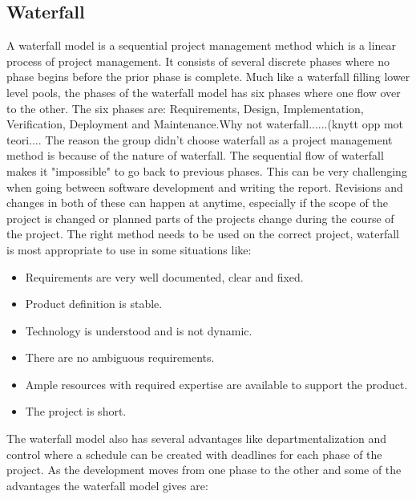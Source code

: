 \subsection{Waterfall}
A waterfall model is a sequential project management method which is a linear process of project management\cite{Waterfall_model}. It consists of several discrete phases where no phase begins before the prior phase is complete. Much like a waterfall filling lower level pools, the phases of the waterfall model has six phases where one flow over to the other. The six phases are: Requirements, Design, Implementation, Verification, Deployment and Maintenance\cite{Waterfall_phases}.Why not waterfall......(knytt opp mot teori.... The reason the group didn't choose waterfall as a project management method is because of the nature of waterfall. The sequential flow of waterfall makes it "impossible" to go back to previous phases. This can be very challenging when going between software development and writing the report. Revisions and changes in both of these can happen at anytime, especially if the scope of the project is changed or planned parts of the projects change during the course of the project.
The right method needs to be used on the correct project, waterfall is most appropriate to use in some situations like:
\begin{itemize}
    \item Requirements are very well documented, clear and fixed.\cite{SDLC_Waterfall_Model}
    \item Product definition is stable.\cite{SDLC_Waterfall_Model}
    \item Technology is understood and is not dynamic.\cite{SDLC_Waterfall_Model} 
    \item There are no ambiguous requirements.\cite{SDLC_Waterfall_Model} 
    \item Ample resources with required expertise are available to support the product.\cite{SDLC_Waterfall_Model}
    \item The project is short.\cite{SDLC_Waterfall_Model}
\end{itemize}
The waterfall model also has several advantages like departmentalization and control where a schedule can be created with deadlines for each phase of the project. As the development moves from one phase to the other and some of the advantages the waterfall model gives are:
